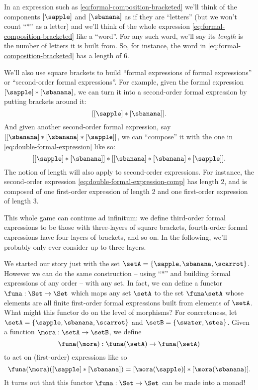 In an expression such as \cref{eq:formal-composition-bracketed} we'll think of the components $[\sapple]$ and $[\sbanana]$ as if they are ``letters'' (but we won't count ``$*$'' as a letter) and we'll think of the whole expression \cref{eq:formal-composition-bracketed} like a ``word''. For any such word, we'll say its \emph{length} is the number of letters it is built from. So, for instance, the word in \cref{eq:formal-composition-bracketed} has a length of $6$. 
 
We'll also use square brackets to build ``formal expressions of formal expressions'' or ``second-order formal expressions''. For example, given the formal expression $[\sapple] * [\sbanana]$, we can turn it into a second-order formal expression by putting brackets around it: 
\begin{equation}\label{eq:double-formal-expression}
[[\sapple] * [\sbanana]].
\end{equation}
And given another second-order formal expression, say $[[\sbanana] * [\sbanana] * [\sapple]]$, we can ``compose'' it with the one in \cref{eq:double-formal-expression} like so: 
\begin{equation}\label{eq:double-formal-expression-comp}
[[\sapple] * [\sbanana]] * [[\sbanana] * [\sbanana] * [\sapple]]. 
\end{equation}
The notion of length will also apply to second-order expressions. For instance, the second-order expression \cref{eq:double-formal-expression-comp} has length 2, and is composed of one first-order expression of length 2 and one first-order expression of length 3. 

This whole game can continue ad infinitum: we define third-order formal expressions to be those with three-layers of square brackets, fourth-order formal expressions have four layers of brackets, and so on. In the following, we'll probably only ever consider up to three layers. 

We started our story just with the set $\setA = \{ \sapple, \sbanana, \scarrot \}$. However we can do the same construction -- using ``$*$'' and building formal expressions of any order -- with any set. In fact, we can define a functor $\funa: \Set \to \Set$ which maps any set $\setA$ to the set $\funa \setA$ whose elements are all finite first-order formal expressions built from elements of $\setA$. What might this functor do on the level of morphisms? For concreteness, let $\setA = \{ \sapple, \sbanana, \scarrot \} $ and $\setB = \{ \swater, \stea \}$. Given a function $\mora: \setA \to \setB$, we define
\begin{equation}
\funa(\mora) : \funa(\setA) \to \funa(\setA)
\end{equation}
to act on (first-order) expressions like so
\begin{equation}
\funa(\mora)([\sapple]*[\sbanana]) = [\mora(\sapple)]*[\mora(\sbanana)].
\end{equation}
It turns out that this functor $\funa: \Set \to \Set$ can be made into a monad! 



